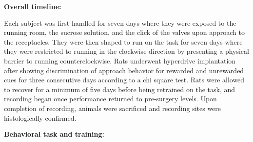 \documentclass[11pt]{article}
\begin{document}
{\bf Overall timeline:}

Each subject was first handled for seven days where they were exposed to the running room, the sucrose solution, and the click of the valves upon approach to the receptacles. They were then shaped to run on the task for seven days where they were restricted to running in the clockwise direction by presenting a physical barrier to running counterclockwise. Rats underwent hyperdrive implantation after showing discrimination of approach behavior for rewarded and unrewarded cues for three consecutive days according to a chi square test. Rats were allowed to recover for a minimum of five days before being retrained on the task, and recording began once performance returned to pre-surgery levels. Upon completion of recording, animals were sacrificed and recording sites were histologically confirmed.

{\bf Behavioral task and training:} 
\end{document}
